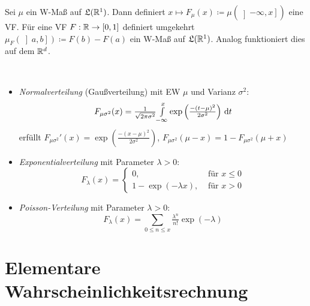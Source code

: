 \documentclass{cheat-sheet}
\newcommand{\LebAlg}{\mathfrak{L}} %
\begin{document}




\begin{bem}
  Sei $\mu$ ein W-Maß auf $\LebAlg(\R^1)$. Dann definiert $x \mapsto F_{\mu}(x) \coloneqq \mu(\left] -\infty, x \right])$ eine VF. Für eine VF $F : \mathbb{R} \to [0,1]$ definiert umgekehrt $\mu_F(\left] a, b \right]) \coloneqq F(b) - F(a)$ ein W-Maß auf $\LebAlg(\R^1)$. Analog funktioniert dies auf dem $\mathbb{R}^d$.
\end{bem}


\begin{defn}\mbox{}\\
  \begin{itemize}
    \item \emph{Normalverteilung} (Gaußverteilung) mit EW $\mu$ und Varianz $\sigma^2$:
    \[ F_{\mu \sigma^2}(x) = \tfrac{1}{\sqrt{2 \pi \sigma^2}} {\textstyle \int\limits_{-\infty}^{x}} \exp\left(\tfrac{-(t-\mu)^2}{2 \sigma^2}\right) \,\mathrm{d} t \]
    erfüllt $F_{\mu \sigma^2}'(x) = \exp\left(\tfrac{-(x-\mu)^2}{2 \sigma^2}\right)$, $F_{\mu \sigma^2}(\mu-x) = 1 - F_{\mu \sigma^2}(\mu+x)$
    \item \emph{Exponentialverteilung} mit Parameter $\lambda > 0$:
    \[ F_{\lambda}(x) = \begin{cases} 0, & \text{ für } x \leq 0 \\
                                      1 - \exp(- \lambda x), & \text{ für } x > 0
    \end{cases} \]
    \item \emph{Poisson-Verteilung} mit Parameter $\lambda > 0$:
    \[ F_{\lambda}(x) = \sum_{0 \leq n \leq x} \tfrac{\lambda^n}{n!} \exp(-\lambda) \]
  \end{itemize}
\end{defn}



\section{Elementare Wahrscheinlichkeitsrechnung}
\end{document}
